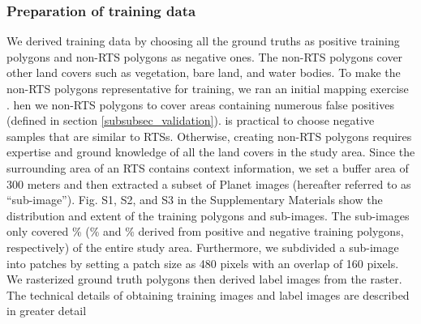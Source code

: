 \documentclass[authoryear,preprint,review,12pt]{elsarticle}
\begin{document}
\subsubsection{Preparation of training data}
\label{subsubsec_pre_trainingdata}

We derived training data by choosing all the ground truths as positive training polygons and  non-RTS polygons as negative ones. The non-RTS polygons cover other land covers such as vegetation, bare land, and water bodies. To make the non-RTS polygons representative for training, we ran an initial mapping exercise . hen we  non-RTS polygons to cover areas containing numerous false positives (defined in section \ref{subsubsec_validation}).  is practical to choose negative samples that are similar to RTSs. Otherwise, creating non-RTS polygons requires expertise and ground knowledge of all the land covers in the study area. Since the surrounding area of an RTS contains context information, we set a buffer area of 300 meters and then extracted a subset of Planet images (hereafter referred to as “sub-image”). Fig. S1, S2, and S3 in the Supplementary Materials show the distribution and extent of the training polygons and sub-images. The sub-images only covered \% (\% and \% derived from positive and negative training polygons, respectively) of the entire study area. Furthermore, we subdivided a sub-image into patches by setting a patch size as 480 pixels with an overlap of 160 pixels.  We rasterized ground truth polygons then derived label images from the raster. The technical details of obtaining training images and label images are described in greater detail   
\end{document}
